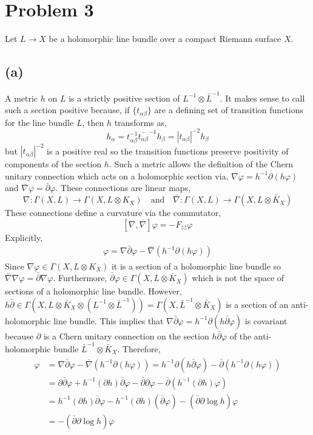 \documentclass[12pt]{extarticle}
\theoremstyle{definition}
\begin{document}
\section*{Problem 3}

Let $L \to X$ be a holomorphic line bundle over a compact Riemann surface $X$. 

\subsection*{(a)}

A metric $h$ on $L$ is a strictly positive section of $L^{-1} \otimes \bar{L}^{-1}$. It makes sense to call such a section positive because, if $\{ t_{\alpha \beta} \}$ are a defining set of transition functions for the line bundle $L$, then  $h$ transforms as,
\[ h_{\alpha} = t_{\alpha \beta}^{-1} \bar{t_{\alpha \beta}}^{-1} h_{\beta} = |t_{\alpha \beta}|^{-2} h_{\beta} \]
but $|t_{\alpha \beta}|^{-2}$ is a positive real so the transition functions preserve positivity of components of the section $h$. Such a metric allows the definition of the Chern unitary connection which acts on a holomorphic section via, $\nabla \varphi = h^{-1} \partial (h \varphi)$ and $\overline{\nabla} \varphi = \bar{\partial} \varphi$. These connections are linear maps,
\[ \nabla : \Gamma(X, L) \to \Gamma(X, L \otimes K_X) \quad \text{and} \quad \bar{\nabla} : \Gamma(X, L) \to \Gamma(X, L \otimes \bar{K}_X) \]
These connections define a curvature via the commutator,
\[ [\nabla, \overline{\nabla}] \varphi = - F_{z \bar{z}} \varphi \]
Explicitly, 
\begin{align*}
[\nabla, \overline{\nabla}] \varphi = \nabla \bar{\partial} \varphi - \bar{\nabla} ( h^{-1} \partial (h \varphi))
\end{align*}
Since $\nabla \varphi \in \Gamma(X, L \otimes K_X)$ it is a section of a holomorphic line bundle so $\bar{\nabla} \nabla \varphi = \bar{\partial} \nabla \varphi$. Furthermore, $\bar{\partial} \varphi \in \Gamma(X, L \otimes \bar{K}_X)$ which is not the space of sections of a holomorphic line bundle. However, $h \bar{\partial} \in \Gamma(X, L \otimes \bar{K}_X \otimes (L^{-1} \otimes \bar{L}^{-1})) = \Gamma(X, \bar{L}^{-1} \otimes \bar{K}_X)$ is a section of an anti-holomorphic line bundle. This implies that $\nabla \bar{\partial} \varphi = h^{-1} \partial (h \bar{\partial} \varphi)$ is covariant because $\partial$ is a Chern unitary connection on the section $h \bar{\partial} \varphi$ of the anti-holomorphic bundle $\bar{L}^{-1} \otimes \bar{K}_X$. Therefore, 
\begin{align*}
[\nabla, \overline{\nabla}] \varphi &  = \nabla \bar{\partial} \varphi - \bar{\nabla} ( h^{-1} \partial (h \varphi)) = h^{-1} \partial (h \bar{\partial} \varphi) - \bar{\partial} (h^{-1} \partial (h \varphi))
\\
& = \partial \bar{\partial} \varphi + h^{-1} (\partial h) \bar{\partial} \varphi - \bar{\partial} \partial \varphi - \bar{\partial} (h^{-1} (\partial h) \varphi)
\\
& = h^{-1} (\partial h) \bar{\partial} \varphi - h^{-1}(\partial h) (\bar{\partial}  \varphi) - (\bar{\partial} \partial \log{h}) \varphi
\\
& = - (\bar{\partial} \partial \log{h}) \varphi
\end{align*} 
\end{document}
